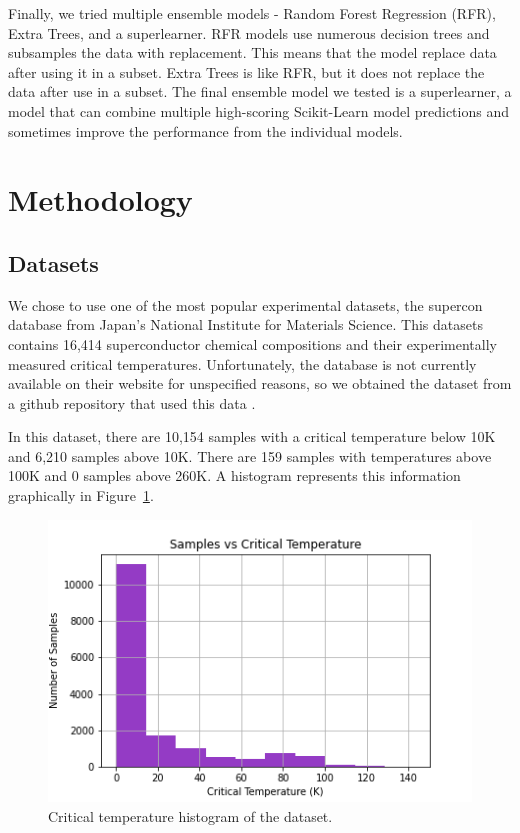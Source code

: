 \documentclass[twocolumn, nofootinbib, secnumarabic, amssymb, nobibnotes, aps, prd]{revtex4-2}
\begin{document}
Finally, we tried multiple ensemble models - Random Forest Regression (RFR), Extra Trees, and a superlearner. RFR models use numerous decision trees and subsamples the data with replacement. This means that the model replace data after using it in a subset. Extra Trees is like RFR, but it does not replace the data after use in a subset. The final ensemble model we tested is a superlearner, a model that can combine multiple high-scoring Scikit-Learn model predictions and sometimes improve the performance from the individual models.


\section{Methodology}
\subsection{Datasets}
We chose to use one of the most popular experimental datasets, the supercon database from Japan's National Institute for Materials Science. This datasets contains 16,414 superconductor chemical compositions and their experimentally measured critical temperatures. Unfortunately, the database is not currently available on their website for unspecified reasons, so we obtained the dataset from a github repository that used this data \cite{vstanev1_2018}. 

In this dataset, there are 10,154 samples with a critical temperature below 10K and 6,210 samples above 10K. There are 159 samples with temperatures above 100K and 0 samples above 260K. A histogram represents this information graphically in Figure~\ref{fig:data-histogram}.

 \begin{figure}[!htb]
    \centering
    \includegraphics[width=\columnwidth]{dataset_histogram.png}
    \caption{Critical temperature histogram of the dataset.}
    \label{fig:data-histogram}
 \end{figure}
\end{document}
